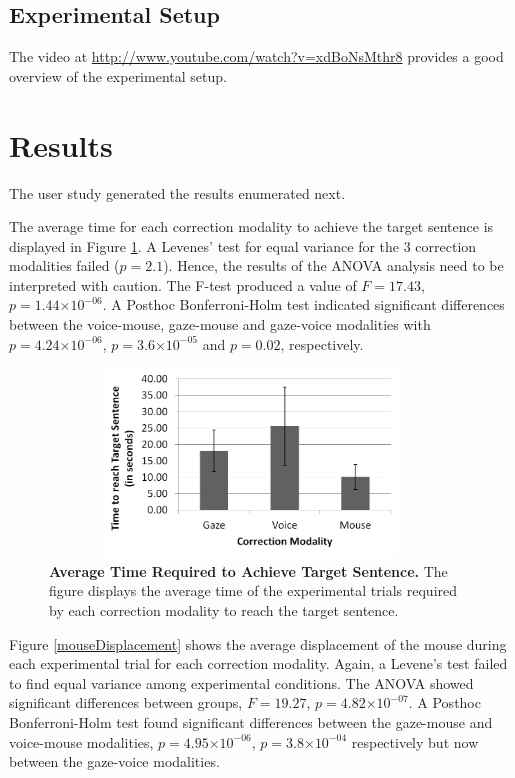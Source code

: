 \documentclass[]{article}
\providecommand{\e}[1]{\ensuremath{\times 10^{#1}}}
\begin{document}
\subsection{Experimental Setup}
The video at \url{http://www.youtube.com/watch?v=xdBoNsMthr8} provides a good overview of the
experimental setup.

\section{Results}
The user study generated the results enumerated next.

The average time  for each correction modality to achieve the target sentence is displayed in Figure \ref{timeFig}.
A Levenes' test for equal variance for the 3 correction modalities failed ($p=2.1$). Hence, the results of the
ANOVA analysis need to be interpreted with caution. The F-test produced a value of $F=17.43$, $p=1.44\e{-06}$.
A Posthoc Bonferroni-Holm test indicated significant differences between the voice-mouse, gaze-mouse and gaze-voice
modalities with $p=4.24\e{-06}$, $p=3.6\e{-05}$ and $p=0.02$, respectively. 
 

\begin{figure}[ht]
\begin{center}
\vspace{-3mm}
\includegraphics[width=0.95\textwidth,height=50mm]{figures/time.png}
\end{center}
\caption{\textbf{Average Time Required to Achieve Target Sentence.} The figure displays the average time of the
experimental trials required by each correction modality to reach the target sentence.}
\label{timeFig}
\end{figure}


Figure \ref{mouseDisplacement} shows the average displacement of the mouse during each experimental trial for each
correction modality. Again, a Levene's test failed to find equal variance among experimental conditions. The ANOVA
showed significant differences between groups,  $F=19.27$, $p=4.82\e{-07}$. A Posthoc Bonferroni-Holm test found
significant differences between the gaze-mouse and voice-mouse modalities,  $p=4.95\e{-06}$,
$p=3.8\e{-04}$ respectively but now between the gaze-voice modalities.
\end{document}
